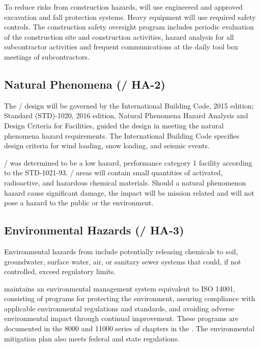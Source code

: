 To reduce risks from construction hazards, \fnal will use engineered
and approved excavation and fall protection systems.  Heavy equipment
will use required safety controls. The \fnal construction safety
oversight program includes periodic evaluation of the construction
site and construction activities, hazard analysis for all
subcontractor activities and frequent  communications at
the daily tool box meetings of subcontractors.

\subsection{Natural Phenomena (/ HA-2)}

The / design will be governed by the
International Building Code, 2015 edition;  Standard
(STD)-1020, 2016 edition, Natural Phenomena Hazard Analysis and Design
Criteria for  Facilities, guided the design in meeting the
natural phenomena hazard requirements.  The International Building
Code specifies design criteria for wind loading, snow loading, and
seismic events.

/ was determined to be a low hazard,
performance category 1 facility according to the 
STD-1021-93. / areas will contain small
quantities of activated, radioactive, and hazardous chemical
materials. Should a natural phenomenon hazard cause significant
damage, the impact will be mission related and will not pose a hazard
to the public or the environment.

\subsection{Environmental Hazards (/ HA-3)}

Environmental hazards from  include potentially releasing
chemicals to soil, groundwater, surface water, air, or sanitary sewer
systems that could, if not controlled, exceed regulatory limits.

\fnal maintains an environmental management system equivalent to ISO
14001, consisting of programs for protecting the environment, assuring
compliance with applicable environmental regulations and standards,
and avoiding adverse environmental impact through continual
improvement.  These programs are documented in the 8000 and 11000
series of chapters in the .  The environmental mitigation
plan also meets federal and state regulations.


